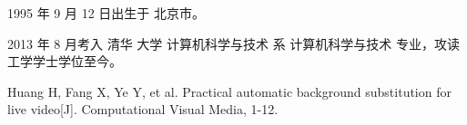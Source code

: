 \begin{resume}


  1995 年 9 月 12 日出生于 北京市。

  2013 年 8 月考入 清华 大学 计算机科学与技术 系 计算机科学与技术 专业，攻读工学学士学位至今。



 
  \begin{publications}
    \item Huang H, Fang X, Ye Y, et al. Practical automatic background substitution for live video[J]. Computational Visual Media, 1-12.
  \end{publications}

  
\end{resume}
